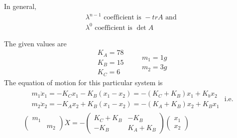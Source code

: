 \documentclass[twoside,10pt]{amsart}
\begin{document}
In general,
\[
\begin{aligned}
& \lambda^{n-1} \text{ coefficient is } -tr A \text{ and } \\
&  \lambda^0 \text{ coefficient is } \det{A}
\end{aligned}
\]

The given values are 
\[
\begin{aligned}
  & K_A = 78   \\
  & K_B = 15  \\
  & K_C = 6 
\end{aligned}
\quad \begin{aligned}
  & m_1 = 1g  \\
  & m_2 = 3 g 
\end{aligned}
\]
The equation of motion for this particular system is 
\[
\begin{gathered}
  \begin{aligned}
    & m_1 \ddot{x}_1 = -K_C x_1 -K_B (x_1 -x_2) = -(K_C + K_B) x_1 + K_b x_2  \\
    & m_2 \ddot{x}_2 = -K_A x_2 + K_B (x_1 -x_2) = -(K_A +K_B)x_2 + K_B x_1 
  \end{aligned} \text{ i.e. } \\
  \left( \begin{matrix} m_1 & \\ & m_2 \end{matrix} \right) \ddot{X} = - \left( \begin{matrix} K_C + K_B & -K_B \\ -K_B & K_A + K_B \end{matrix} \right) \left( \begin{matrix} x_1 \\ x_2 \end{matrix} \right) \end{gathered}
\]
\end{document}
